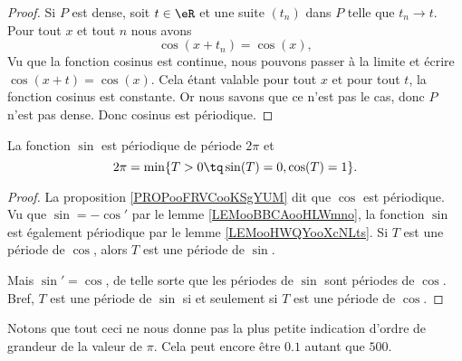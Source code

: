 \begin{proof}
	Si \( P\) est dense, soit \( t\in \eR\) et une suite \( (t_n)\) dans \( P\) telle que \( t_n\to t\). Pour tout \( x\) et tout \( n\) nous avons
	\begin{equation}
		\cos(x+t_n)=\cos(x),
	\end{equation}
	Vu que la fonction cosinus est continue, nous pouvons passer à la limite et écrire \( \cos(x+t)=\cos(x)\). Cela étant valable pour tout \( x\) et pour tout \( t\), la fonction cosinus est constante. Or nous savons que ce n'est pas le cas, donc \( P\) n'est pas dense. Donc cosinus est périodique.
\end{proof}

\begin{proposition}     \label{PROPooKNLAooLwQHea}
	La fonction \( \sin\) est périodique de période \( 2\pi\) et
	\begin{equation}
		2\pi=\min\{ T>0\tq \sin(T)=0,\cos(T)=1 \}.
	\end{equation}
\end{proposition}

\begin{proof}
	La proposition \ref{PROPooFRVCooKSgYUM} dit que \( \cos\) est périodique. Vu que \( \sin=-\cos'\) par le lemme \ref{LEMooBBCAooHLWmno}, la fonction \( \sin\) est également périodique par le lemme \ref{LEMooHWQYooXcNLts}. Si \( T\) est une période de \( \cos\), alors \( T\) est une période de \( \sin\).

	Mais \( \sin'=\cos\), de telle sorte que les périodes de \( \sin\) sont périodes de \( \cos\). Bref, \( T\) est une période de \( \sin\) si et seulement si \( T\) est une période de \( \cos\).
\end{proof}

\begin{normaltext}
	Notons que tout ceci ne nous donne pas la plus petite indication d'ordre de grandeur de la valeur de \( \pi\). Cela peut encore être \( 0.1\) autant que \( 500\).
\end{normaltext}

